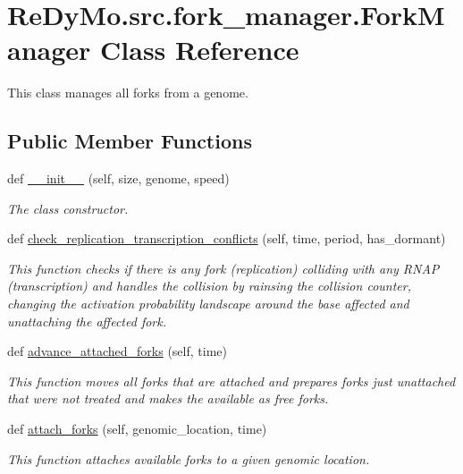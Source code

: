 \hypertarget{classReDyMo_1_1src_1_1fork__manager_1_1ForkManager}{}\section{Re\+Dy\+Mo.\+src.\+fork\+\_\+manager.\+Fork\+Manager Class Reference}
\label{classReDyMo_1_1src_1_1fork__manager_1_1ForkManager}


This class manages all forks from a genome.  


\subsection*{Public Member Functions}
\begin{DoxyCompactItemize}
\item 
\mbox{\label{classReDyMo_1_1src_1_1fork__manager_1_1ForkManager_a199088d11b6ef93913a4dc3db2086e90}} 
def \mbox{\hyperlink{classReDyMo_1_1src_1_1fork__manager_1_1ForkManager_a199088d11b6ef93913a4dc3db2086e90}{\+\_\+\+\_\+init\+\_\+\+\_\+}} (self, size, genome, speed)
\begin{DoxyCompactList}\small\item\em The class constructor. \end{DoxyCompactList}\item 
def \mbox{\hyperlink{classReDyMo_1_1src_1_1fork__manager_1_1ForkManager_a1a5940ebd74e69fefb9f7cc00ab79737}{check\+\_\+replication\+\_\+transcription\+\_\+conflicts}} (self, time, period, has\+\_\+dormant)
\begin{DoxyCompactList}\small\item\em This function checks if there is any fork (replication) colliding with any R\+N\+AP (transcription) and handles the collision by rainsing the collision counter, changing the activation probability landscape around the base affected and unattaching the affected fork. \end{DoxyCompactList}\item 
def \mbox{\hyperlink{classReDyMo_1_1src_1_1fork__manager_1_1ForkManager_a78145066ccb9f6b3d86bb0c08aed2bb6}{advance\+\_\+attached\+\_\+forks}} (self, time)
\begin{DoxyCompactList}\small\item\em This function moves all forks that are attached and prepares forks just unattached that were not treated and makes the available as free forks. \end{DoxyCompactList}\item 
def \mbox{\hyperlink{classReDyMo_1_1src_1_1fork__manager_1_1ForkManager_a8cf93e36729878575dfecba9978f357a}{attach\+\_\+forks}} (self, genomic\+\_\+location, time)
\begin{DoxyCompactList}\small\item\em This function attaches available forks to a given genomic location. \end{DoxyCompactList}\end{DoxyCompactItemize}
